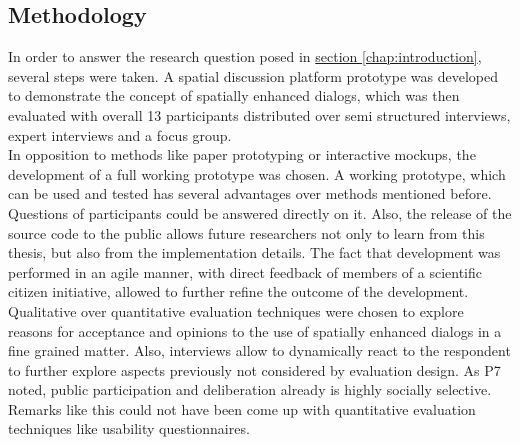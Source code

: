 \subsection{Methodology}
\label{sub:method-discussion}
In order to answer the research question posed in \hyperref[chap:introduction]{section \ref{chap:introduction}}, several steps were taken. A spatial discussion platform prototype was developed to demonstrate the concept of spatially enhanced dialogs, which was then evaluated with overall 13 participants distributed over semi structured interviews, expert interviews and a focus group.\\
In opposition to methods like paper prototyping or interactive mockups, the development of a full working prototype was chosen. A working prototype, which can be used and tested has several advantages over methods mentioned before. Questions of participants could be answered directly on it. Also, the release of the source code to the public allows future researchers not only to learn from this thesis, but also from the implementation details. The fact that development was performed in an agile manner, with direct feedback of members of a scientific citizen initiative, allowed to further refine the outcome of the development.\\
Qualitative over quantitative evaluation techniques were chosen to explore reasons for acceptance and opinions to the use of spatially enhanced dialogs in a fine grained matter. Also, interviews allow to dynamically react to the respondent to further explore aspects previously not considered by evaluation design. As P7 noted, public participation and deliberation already is highly socially selective. Remarks like this could not have been come up with quantitative evaluation techniques like usability questionnaires.\\

